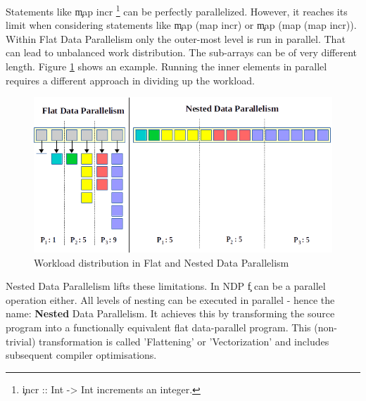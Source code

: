     
    Statements like \c{map incr}
    \footnote{\c{incr :: Int -> Int} increments an integer.}
    can be perfectly parallelized.
    However, it reaches its limit when considering statements like \c{map (map incr)} or \c{map (map (map incr))}.
    Within Flat Data Parallelism only the outer-most level is run in parallel.
    That can lead to unbalanced work distribution.
    The sub-arrays can be of very different length. Figure \ref{figure:fdpvsndp}
    shows an example.
    Running the inner elements in parallel requires a different approach in dividing up the workload.
    
    
    \begin{figure}[h!]
        \begin{center}
        \includegraphics[width=\linewidth]{fdpvsndp.png}
        \caption{Workload distribution in Flat and Nested Data Parallelism}
        \label{figure:fdpvsndp}
        \end{center}
    \end{figure}
    
    \p
    Nested Data Parallelism lifts these limitations.
    In NDP \c{f} can be a parallel operation either. All levels of nesting can
    be executed in parallel - hence the name: \textbf{Nested} Data Parallelism.
    It achieves this by transforming the source program into a functionally
    equivalent flat data-parallel program. This (non-trivial) transformation
    is called 'Flattening' or 'Vectorization' and includes subsequent compiler optimisations.
    
